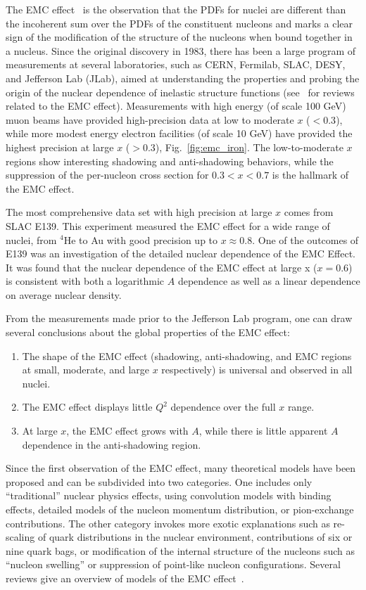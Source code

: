 The EMC effect~\cite{Aubert:1983xm} is the observation that the PDFs for nuclei are different than
the incoherent sum over the PDFs of the constituent nucleons and marks a clear sign of the modification
of the structure of the nucleons when bound together in a nucleus.
Since the original discovery in 1983, there has been a large
program of measurements at several laboratories, such as CERN, Fermilab, SLAC, DESY, and Jefferson Lab (JLab),
aimed at understanding the properties and probing the origin of the nuclear dependence of inelastic
structure functions (see~\cite{Geesaman:1995yd, Malace:2014uea, Hen:2016kwk} for reviews related to the EMC effect).
Measurements with high energy (of scale 100 GeV) muon beams have provided high-precision data at low to
moderate $x$ ($<0.3$), while more modest energy electron facilities (of scale 10 GeV) have provided
the highest precision at large $x$ ($>0.3$), Fig.~\ref{fig:emc_iron}.  The low-to-moderate $x$
regions show interesting shadowing and anti-shadowing behaviors, while the suppression of the
per-nucleon cross section for $0.3<x<0.7$ is the hallmark of the EMC effect.

The most comprehensive data set with high precision at large $x$ comes from SLAC E139. This experiment
measured the EMC effect for a wide range of nuclei, from $^4$He to Au with good precision up to
$x\approx0.8$.  One of the outcomes of E139 was an investigation of the detailed nuclear dependence of the EMC
Effect. It was found that the nuclear dependence of the EMC effect at large x ($x=0.6$) is consistent
with both a logarithmic $A$ dependence as well as a linear dependence on average nuclear density.

From the measurements made prior to the Jefferson Lab program, one can draw several conclusions about
the global properties of the EMC effect:
\begin{enumerate}
 \item{The shape of the EMC effect (shadowing, anti-shadowing, and EMC regions at small, moderate, and
  large $x$ respectively) is universal and observed in all nuclei.}
 \item{The EMC effect displays little $Q^2$ dependence over the full $x$ range.}
 \item{At large $x$, the EMC effect grows with $A$, while there is little apparent $A$ dependence in the
   anti-shadowing region.}
\end{enumerate}

Since the first observation of the EMC effect, many theoretical models have been proposed and can be subdivided into two categories.  One includes only ``traditional'' nuclear physics effects, using convolution models with binding effects, detailed models of the nucleon momentum distribution, or pion-exchange contributions. The other category invokes more exotic explanations such as re-scaling of quark distributions in the nuclear environment, contributions of six or nine
quark bags, or modification of the internal structure of the nucleons such as ``nucleon swelling'' or suppression of point-like nucleon configurations. Several reviews give an overview of models of the EMC effect~\cite{Geesaman:1995yd, Norton:2003cb, Piller:1999wx, Hen:2013oha, Malace:2014uea}.


